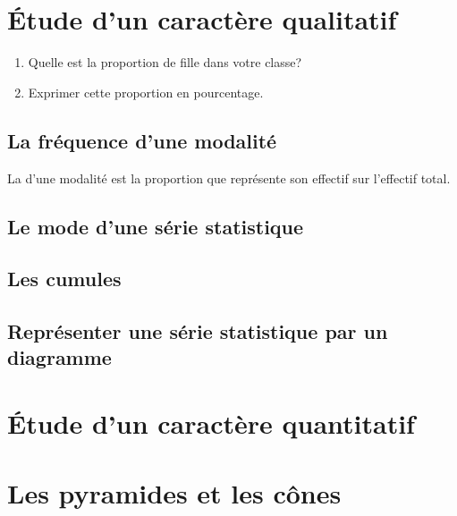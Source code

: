 \documentclass[12pt,a4paper]{report}
\begin{document}
\chapter{Étude d'un caractère qualitatif} 
\begin{act}
\begin{enumerate}
\item Quelle est la proportion de fille dans votre classe?
\item Exprimer cette proportion en pourcentage.
\end{enumerate}
\end{act}

\section{La fréquence d'une modalité}
\begin{defn}
La  d'une modalité est la proportion que représente son effectif sur l'effectif total.
\end{defn}

\section{Le mode d'une série statistique}
\section{Les cumules}
\section{Représenter une série statistique par un diagramme}

\chapter{Étude d'un caractère quantitatif}

\chapter{Les pyramides et les cônes}
\end{document}

